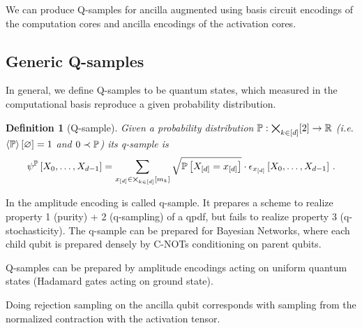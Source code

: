 \documentclass[aps,onecolumn,nofootinbib,pra]{article}
\newtheorem{lemma}{Lemma}
\newtheorem{definition}{Definition}
\begin{document}
    We can produce Q-samples for ancilla augmented \ComputationActivationNetworks{}  using basis circuit encodings of the computation cores and ancilla encodings of the activation cores.

    \subsection{Generic Q-samples}

    In general, we define Q-samples to be quantum states, which measured in the computational basis reproduce a given probability distribution.

    \begin{definition}[Q-sample]
        Given a probability distribution $\mathbb{P}:\bigtimes_{k\in[d]}[2]\rightarrow\mathbb{R}$ (i.e. $\left\langle \mathbb{P}\right\rangle \left[ \varnothing \right]=1$ and $0 \prec \mathbb{P}$) its q-sample is
        \begin{align*}
            \psi^{\mathbb{P}}\left[X_{0},\ldots,X_{d-1}\right]
            = \sum_{x_{[d]}\in\bigtimes_{k\in[d]}[m_{k}]} \sqrt{\mathbb{P}\left[X_{[d]}=x_{[d]}\right]} \cdot \epsilon_{x_{[d]}}\left[X_{0},\ldots,X_{d-1}\right] \, .
        \end{align*}
    \end{definition}

    In \cite{low_quantum_2014} the amplitude encoding is called q-sample.
    It prepares a scheme to realize property 1 (purity) + 2 (q-sampling) of a qpdf, but fails to realize property 3 (q-stochasticity).
    The q-sample can be prepared for Bayesian Networks, where each child qubit is prepared densely by C-NOTs conditioning on parent qubits.

    Q-samples can be prepared by amplitude encodings acting on uniform quantum states (Hadamard gates acting on ground state).


    Doing rejection sampling on the ancilla qubit corresponds with sampling from the normalized contraction with the activation tensor.
\end{document}
